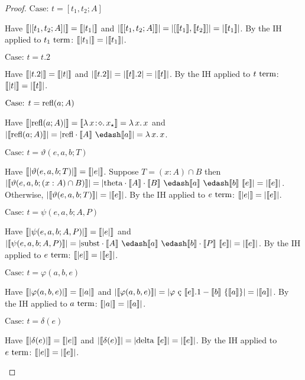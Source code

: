 \begin{proof}
    $\text{Case: }t = [t_1, t_2; A]$
    \begin{proofcase}
        Have $\llbracket |[t_1, t_2; A]| \rrbracket = \llbracket |t_1| \rrbracket$ and $|\llbracket [t_1, t_2; A] \rrbracket| = |[\llbracket t_1 \rrbracket, \llbracket t_2 \rrbracket]| = |\llbracket t_1 \rrbracket|$.
        By the IH applied to $t_1~\textnormal{term}$: $\llbracket |t_1| \rrbracket = |\llbracket t_1 \rrbracket|$.
    \end{proofcase}

    $\text{Case: }t = t.2$
    \begin{proofcase}
        Have $\llbracket |t.2| \rrbracket = \llbracket |t| \rrbracket$ and $|\llbracket t.2 \rrbracket| = |\llbracket t \rrbracket.2| = |\llbracket t \rrbracket|$.
        By the IH applied to $t~\textnormal{term}$: $\llbracket |t| \rrbracket = |\llbracket t \rrbracket|$.
    \end{proofcase}

    $\text{Case: }t = \textnormal{refl}(a; A)$
    \begin{proofcase}
        Have $\llbracket |\textnormal{refl}(a; A)| \rrbracket = \llbracket {\lambda}\, x\! : \! \diamond.\, x_\star \rrbracket = {\lambda}\, x.\, x$ and $|\sema{\prefl(a; A)}| = |\crefl \cdot \sema{A}\ \edash \sema{a}| = \absu{\lambda}{x}{x}$.
    \end{proofcase}

    $\text{Case: }t = \vartheta(e, a, b; T)$
    \begin{proofcase}
        Have $\llbracket |\vartheta(e, a, b; T)| \rrbracket = \llbracket |e| \rrbracket$.
        Suppose $T = (x : A) \cap B$ then $|\sema{\vartheta(e, a, b; (x : A) \cap B)}| = |\ctheta \cdot \sema{A} \cdot \sema{B}\ \edash \sema{a}\ \edash \sema{b}\ \sema{e}| = |\sema{e}|$.
        Otherwise, $|\llbracket \vartheta(e, a, b; T) \rrbracket| = |\llbracket e \rrbracket|$.
        By the IH applied to $e~\textnormal{term}$: $\llbracket |e| \rrbracket = |\llbracket e \rrbracket|$.
    \end{proofcase}

    $\text{Case: }t = \psi(e, a, b; A, P)$
    \begin{proofcase}
        Have $\llbracket |\psi(e, a, b; A, P)| \rrbracket = \llbracket |e| \rrbracket$ and $|\sema{\psi(e, a, b; A, P)}| = |\csubst \cdot \sema{A}\ \edash \sema{a}\ \edash \sema{b} \cdot \sema{P}\ \sema{e}| = |\sema{e}|$.
        By the IH applied to $e~\textnormal{term}$: $\llbracket |e| \rrbracket = |\llbracket e \rrbracket|$.
    \end{proofcase}

    $\text{Case: }t = \varphi(a, b, e)$
    \begin{proofcase}
        Have $\llbracket |\varphi(a, b, e)| \rrbracket = \llbracket |a| \rrbracket$ and $|\sema{\varphi(a, b, e)}| = |\varphi\ \text{\c{c}}\ \sema{e}.1 - \sema{b}\ \{ \sema{a} \}| = |\sema{a}|$.
        By the IH applied to $a~\textnormal{term}$: $\llbracket |a| \rrbracket = |\llbracket a \rrbracket|$.
    \end{proofcase}

    $\text{Case: }t = \delta(e)$
    \begin{proofcase}
        Have $\llbracket |\delta(e)| \rrbracket = \llbracket |e| \rrbracket$ and $|\llbracket \delta(e) \rrbracket| = |\textnormal{delta}\ \llbracket e \rrbracket| = |\llbracket e \rrbracket|$.
        By the IH applied to $e~\textnormal{term}$: $\llbracket |e| \rrbracket = |\llbracket e \rrbracket|$.
    \end{proofcase}
\end{proof}

